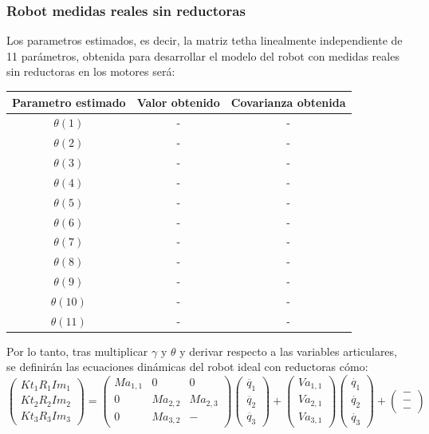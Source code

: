 \subsubsection{Robot medidas reales sin reductoras}
Los parametros estimados, es decir, la matriz tetha linealmente independiente de 11 parámetros, obtenida para desarrollar el modelo del robot con medidas reales sin reductoras en los motores será:
\begin{center}
	\begin{tabular}{| c | c | c |}

		\hline
		Parametro estimado & Valor obtenido & Covarianza obtenida \\
		\hline
		$\theta(1) $ & - & - \\
		\hline
		$\theta(2) $ & - & - \\
		\hline
		$\theta(3) $ & - & - \\
		\hline
		$\theta(4) $ & - & - \\
		\hline
		$\theta(5) $ & - & - \\
		\hline
		$\theta(6) $ & - & - \\
		\hline
		$\theta(7) $ & - & - \\
		\hline
		$\theta(8) $ & - & - \\
		\hline
		$\theta(9) $ & - & - \\
		\hline
		$\theta(10) $ & - & - \\
		\hline
		$\theta(11) $ & - & - \\
		\hline
	\end{tabular}
\end{center}
Por lo tanto, tras multiplicar $\gamma$ y $\theta$ y derivar respecto a las variables articulares, se definirán las ecuaciones dinámicas del robot ideal con reductoras cómo:\\
\[
	\begin{pmatrix}
	Kt_{1}R_{1}Im_{1} \\
	Kt_{2}R_{2}Im_{2} \\
	Kt_{3}R_{3}Im_{3}
	\end{pmatrix} =
	\begin{pmatrix}
	Ma_{1,1} & 0 & 0 \\
	0 & Ma_{2,2} & Ma_{2,3}\\
	0 & Ma_{3,2} & -
	\end{pmatrix}
	\begin{pmatrix}
	\ddot{q_{1}} \\
	\ddot{q_{2}}  \\
	\ddot{q_{3}}
\end{pmatrix} +
\begin{pmatrix}
	Va_{1,1}\\
	Va_{2,1} \\
  Va_{3,1}
\end{pmatrix}
\begin{pmatrix}
		\dot{q_{1}} \\
		\dot{q_{2}}  \\
		\dot{q_{3}}
\end{pmatrix} +
\begin{pmatrix}
-	\\
- \\
-
\end{pmatrix}
\]


